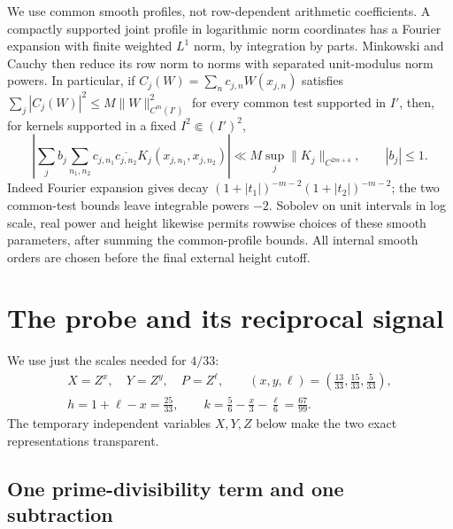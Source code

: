 \documentclass[11pt,a4paper]{article}
\begin{document}
We use common smooth profiles, not row-dependent arithmetic coefficients. A compactly supported joint profile in logarithmic norm coordinates has a Fourier expansion with finite weighted \(L^1\) norm, by integration by parts. Minkowski and Cauchy then reduce its row norm to norms with separated unit-modulus norm powers. In particular, if \(C_j(W)=\sum_nc_{j,n}W(x_{j,n})\) satisfies \(\sum_j|C_j(W)|^2\le M\|W\|_{C^m(I')}^2\) for every common test supported in \(I'\), then, for kernels supported in a fixed \(I^2\Subset(I')^2\), \[
\left|\sum_jb_j\sum_{n_1,n_2}c_{j,n_1}\overline{c_{j,n_2}}
 K_j(x_{j,n_1},x_{j,n_2})\right|
 \ll M\sup_j\|K_j\|_{C^{2m+4}},\qquad |b_j|\le1.
\tag{1.4}\label{eq:1.4}
\] Indeed Fourier expansion gives decay \((1+|t_1|)^{-m-2}(1+|t_2|)^{-m-2}\); the two common-test bounds leave integrable powers \(-2\). Sobolev on unit intervals in log scale, real power and height likewise permits rowwise choices of these smooth parameters, after summing the common-profile bounds. All internal smooth orders are chosen before the final external height cutoff.

\section{The probe and its reciprocal signal}\label{sec:2}

We use just the scales needed for \(4/33\): \[
\begin{gathered}
 X=Z^x,\quad Y=Z^y,\quad P=Z^\ell,\qquad
 (x,y,\ell)=\left(\frac{13}{33},\frac{15}{33},\frac5{33}\right),\\
 h=1+\ell-x=\frac{25}{33},\qquad k=\frac56-\frac x3-\frac\ell6=\frac{67}{99}.
\end{gathered}
\tag{2.1}\label{eq:2.1}
\] The temporary independent variables \(X,Y,Z\) below make the two exact representations transparent.

\subsection{One prime-divisibility term and one subtraction}\label{sec:2.1}
\end{document}
